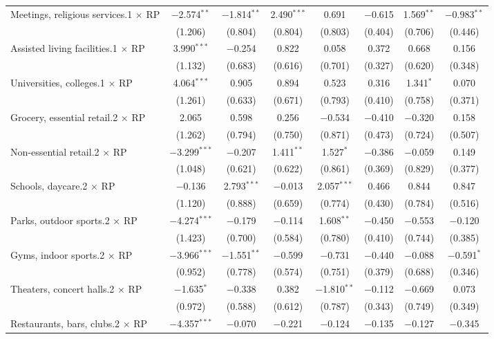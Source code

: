 \begin{table}[!htbp]
\begin{tabular}{@{\extracolsep{5pt}}lccccccc}
  Meetings, religious services.1 $\times$ RP & $-$2.574$^{**}$ & $-$1.814$^{**}$ & 2.490$^{***}$ & 0.691 & $-$0.615 & 1.569$^{**}$ & $-$0.983$^{**}$ \\ 
  & (1.206) & (0.804) & (0.804) & (0.803) & (0.404) & (0.706) & (0.446) \\ 
  Assisted living facilities.1 $\times$ RP & 3.990$^{***}$ & $-$0.254 & 0.822 & 0.058 & 0.372 & 0.668 & 0.156 \\ 
  & (1.132) & (0.683) & (0.616) & (0.701) & (0.327) & (0.620) & (0.348) \\ 
  Universities, colleges.1 $\times$ RP & 4.064$^{***}$ & 0.905 & 0.894 & 0.523 & 0.316 & 1.341$^{*}$ & 0.070 \\ 
  & (1.261) & (0.633) & (0.671) & (0.793) & (0.410) & (0.758) & (0.371) \\ 
  Grocery, essential retail.2 $\times$ RP & 2.065 & 0.598 & 0.256 & $-$0.534 & $-$0.410 & $-$0.320 & 0.158 \\ 
  & (1.262) & (0.794) & (0.750) & (0.871) & (0.473) & (0.724) & (0.507) \\ 
  Non-essential retail.2 $\times$ RP & $-$3.299$^{***}$ & $-$0.207 & 1.411$^{**}$ & 1.527$^{*}$ & $-$0.386 & $-$0.059 & 0.149 \\ 
  & (1.048) & (0.621) & (0.622) & (0.861) & (0.369) & (0.829) & (0.377) \\ 
  Schools, daycare.2 $\times$ RP & $-$0.136 & 2.793$^{***}$ & $-$0.013 & 2.057$^{***}$ & 0.466 & 0.844 & 0.847 \\ 
  & (1.120) & (0.888) & (0.659) & (0.774) & (0.430) & (0.784) & (0.516) \\ 
  Parks, outdoor sports.2 $\times$ RP & $-$4.274$^{***}$ & $-$0.179 & $-$0.114 & 1.608$^{**}$ & $-$0.450 & $-$0.553 & $-$0.120 \\ 
  & (1.423) & (0.700) & (0.584) & (0.780) & (0.410) & (0.744) & (0.385) \\ 
  Gyms, indoor sports.2 $\times$ RP & $-$3.966$^{***}$ & $-$1.551$^{**}$ & $-$0.599 & $-$0.731 & $-$0.440 & $-$0.088 & $-$0.591$^{*}$ \\ 
  & (0.952) & (0.778) & (0.574) & (0.751) & (0.379) & (0.688) & (0.346) \\ 
  Theaters, concert halls.2 $\times$ RP & $-$1.635$^{*}$ & $-$0.338 & 0.382 & $-$1.810$^{**}$ & $-$0.112 & $-$0.669 & 0.073 \\ 
  & (0.972) & (0.588) & (0.612) & (0.787) & (0.343) & (0.749) & (0.349) \\ 
  Restaurants, bars, clubs.2 $\times$ RP & $-$4.357$^{***}$ & $-$0.070 & $-$0.221 & $-$0.124 & $-$0.135 & $-$0.127 & $-$0.345 \\ 

\end{tabular}
\end{table}
